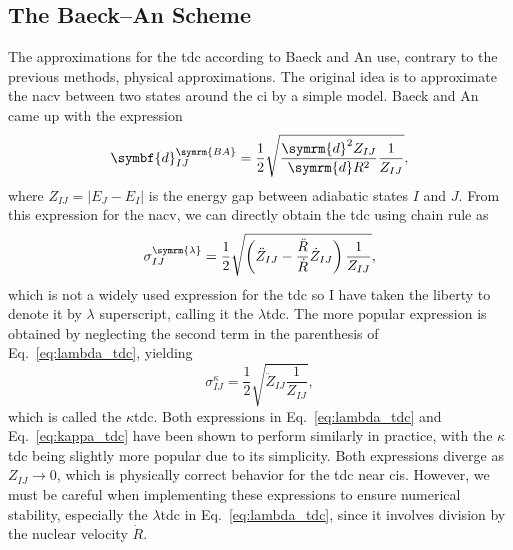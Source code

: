 \subsection{The Baeck--An Scheme}\label{sec:baeck_an}
The approximations for the \gls{tdc} according to Baeck and An use, contrary to the previous methods, physical approximations. The original idea is to approximate the \gls{nacv} between two states around the \gls{ci} by a simple model. Baeck and An came up with the expression\supercite{10.1063/1.4975323}
\begin{equation}\label{eq:baeck_an_nacv}
\symbf{d}_{IJ}^{\symrm{BA}}=\frac{1}{2}\sqrt{\frac{\symrm{d}^2Z_{IJ}}{\symrm{d}R^2}\frac{1}{Z_{IJ}}},
\end{equation}
where $Z_{IJ}=\lvert E_J-E_I\rvert$ is the energy gap between adiabatic states $I$ and $J$. From this expression for the \gls{nacv}, we can directly obtain the \gls{tdc} using chain rule as
\begin{equation}\label{eq:lambda_tdc}
\sigma_{IJ}^{\symrm{\lambda}}=\frac{1}{2}\sqrt{\left(\ddot Z_{IJ}-\frac{\ddot R}{\dot R}\dot Z_{IJ}\right)\frac{1}{Z_{IJ}}},
\end{equation}
which is not a widely used expression for the \gls{tdc} so I have taken the liberty to denote it by $\lambda$ superscript, calling it the $\lambda$\gls{tdc}.\supercite{10.1021/acs.jctc.5c01176} The more popular expression is obtained by neglecting the second term in the parenthesis of Eq.~\eqref{eq:lambda_tdc}, yielding
\begin{equation}\label{eq:kappa_tdc}
\sigma_{IJ}^{\kappa}=\frac{1}{2}\sqrt{\ddot Z_{IJ}\frac{1}{Z_{IJ}}},
\end{equation}
which is called the $\kappa$\gls{tdc}.\supercite{10.1021/acs.jctc.1c01080,10.1021/acs.jctc.3c00813,10.12688/openreseurope.13624.2} Both expressions in Eq.~\eqref{eq:lambda_tdc} and Eq.~\eqref{eq:kappa_tdc} have been shown to perform similarly in practice,\supercite{10.1021/acs.jctc.5c01176} with the $\kappa$\gls{tdc} being slightly more popular due to its simplicity. Both expressions diverge as $Z_{IJ}\to 0$, which is physically correct behavior for the \gls{tdc} near \glspl{ci}. However, we must be careful when implementing these expressions to ensure numerical stability, especially the $\lambda$\gls{tdc} in Eq.~\eqref{eq:lambda_tdc}, since it involves division by the nuclear velocity $\dot R$.

